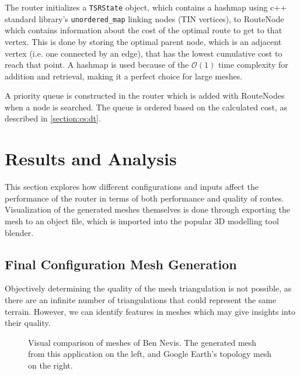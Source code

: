 \documentclass[12pt]{article}
\begin{document}
The router initializes a \texttt{TSRState} object, which contains a hashmap using c++ standard library's \texttt{unordered\_map} linking nodes (TIN vertices), to RouteNode which contains information about the cost of the optimal route to  get to that vertex. This is done by storing the optimal parent node, which is an adjacent vertex (i.e. one connected by an edge), that has the lowest cumulative cost to reach that point. A hashmap is used because of the $\mathcal{O} (1)$ time complexity for addition and retrieval, making it a perfect choice for large meshes.

A priority queue is constructed in the router which is added with RouteNodes when a node is searched. The queue is ordered based on the calculated cost, as described in \autoref{section:cs:dt}.

\section{Results and Analysis}

This section explores how different configurations and inputs affect the performance of the router in terms of both performance and quality of routes. Visualization of the generated meshes themselves is done through exporting the mesh to an object file, which is imported into the popular 3D modelling tool blender.

\subsection{Final Configuration Mesh Generation}

Objectively determining the quality of the mesh triangulation is not possible, as there are an infinite number of triangulations that could represent the same terrain. However, we can identify features in meshes which may give insights into their quality.

\begin{figure}[!htbp]
  \centering
  \caption{Visual comparison of meshes of Ben Nevis. The generated mesh from this application on the left, and Google Earth's topology mesh on the right.}\label{fig:mesh:benNevis:comparison}
\end{figure}
\end{document}
